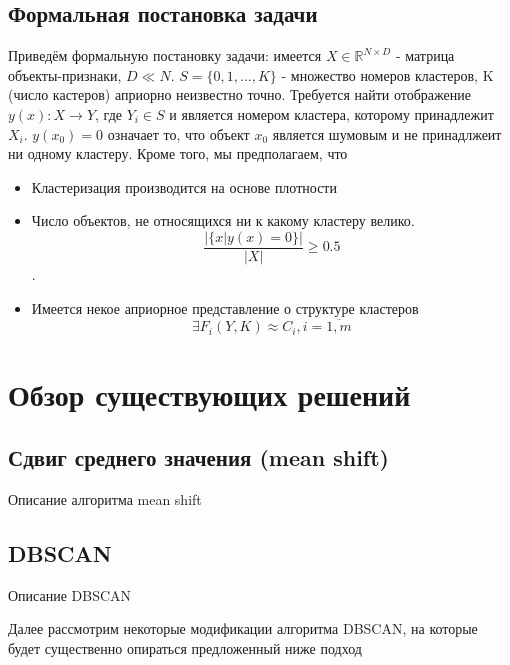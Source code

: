 \documentclass[12pt,fleqn]{article}
\begin{document}
\subsection{Формальная постановка задачи}
Приведём формальную постановку задачи: имеется $X \in \mathbb {R}^{N \times D}$ -  матрица объекты-признаки, $D \ll N$. $S = \{0, 1, ..., K \}$ - множество номеров кластеров, K (число кастеров) априорно неизвестно точно. Требуется найти отображение $y(x): X \rightarrow Y$, где $Y_i \in S$ и является номером кластера, которому принадлежит $X_i$.
 $y(x_0) = 0$ означает то, что объект $x_0$ является шумовым и не принадлжеит ни одному кластеру. Кроме того, мы предполагаем, что
\begin{itemize}
\item Кластеризация производится на основе плотности 

\item Число объектов, не относящихся ни к какому кластеру велико. 
\begin{equation}\label{more_noize}
         \frac{|\{x|y(x)=0\}|}{|X|} \geqslant 0.5
      \end{equation}. 
\item Имеется некое априорное представление о структуре кластеров
\begin{equation}\label{features}
         \exists  F_i(Y, K) \approx C_i, i = \overline{1, m}
      \end{equation}
\end{itemize}

\section{Обзор существующих решений}

\subsection{Сдвиг среднего значения (mean shift)}
Описание алгоритма mean shift

\subsection {DBSCAN}
Описание DBSCAN

Далее рассмотрим некоторые модификации алгоритма DBSCAN, на которые будет существенно опираться предложенный ниже подход
\end{document}
